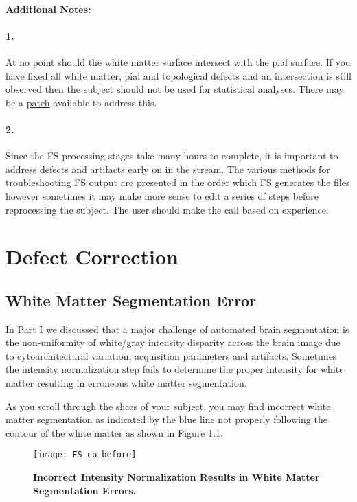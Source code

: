 \documentclass[paper=a4, fontsize=11pt]{scrartcl} %
\numberwithin{equation}{section} %
\numberwithin{figure}{section} %
\numberwithin{table}{section} %
\begin{document}
\paragraph{Additional Notes:}  \paragraph{1.} At no point should the white matter surface intersect with the pial surface. If you have fixed all white matter, pial and topological defects and an intersection is still observed then the subject should not be used for statistical analyses.  There may be a \href{https://www.mail-archive.com/freesurfer%40nmr.mgh.harvard.edu/msg39636.html}{patch} available to address this.
\paragraph{2.} Since the FS processing stages take many hours to complete, it is important to address defects and artifacts early on in the stream.  The various methods for troubleshooting FS output are presented in the order which FS generates the files however sometimes it may make more sense to edit a series of steps before reprocessing the subject.  The user should make the call based on experience.


\section{Defect Correction}
\subsection{White Matter Segmentation Error}\label{ss:wser} In Part I we discussed that a major challenge of automated brain segmentation is the non-uniformity of white/gray intensity disparity across the brain image due to cytoarchitectural variation, acquisition parameters and artifacts.  Sometimes the intensity normalization step fails to determine the proper intensity for white matter resulting in erroneous white matter segmentation. 

As you scroll through the slices of your subject, you may find incorrect white matter segmentation as indicated by the blue line not properly following the contour of the white matter as shown in Figure 1.1.

\begin{figure}[h]
\texttt{[image: FS\_cp\_before]}
\caption{\textbf{Incorrect Intensity Normalization Results in White Matter \mbox{Segmentation} Errors.}}
\end{figure}
\end{document}
